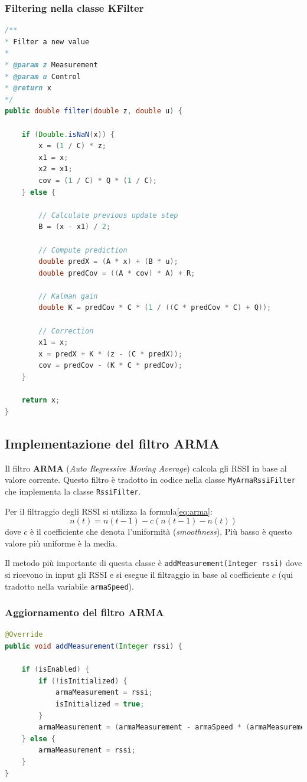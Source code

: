 \subsubsection{Filtering nella classe KFilter}
\begin{lstlisting}[language=Java]
/**
* Filter a new value
*
* @param z Measurement
* @param u Control
* @return x
*/
public double filter(double z, double u) {
   	
   	if (Double.isNaN(x)) {
   		x = (1 / C) * z;
   		x1 = x;
   		x2 = x1;
   		cov = (1 / C) * Q * (1 / C);
   	} else {
   	
    	// Calculate previous update step
    	B = (x - x1) / 2;
   	
    	// Compute prediction
    	double predX = (A * x) + (B * u);
    	double predCov = ((A * cov) * A) + R;
   	
    	// Kalman gain
    	double K = predCov * C * (1 / ((C * predCov * C) + Q));
    	
    	// Correction
    	x1 = x;
    	x = predX + K * (z - (C * predX));
    	cov = predCov - (K * C * predCov);
	}

	return x;
}
\end{lstlisting}

\subsection{Implementazione del filtro ARMA}\label{ch:filtro_arma}
Il filtro \textbf{ARMA} (\textit{Auto Regressive Moving Average}) calcola gli RSSI in base al valore corrente. Questo filtro è tradotto in codice nella classe \texttt{MyArmaRssiFilter} che implementa la classe \texttt{RssiFilter}.

Per il filtraggio degli RSSI si utilizza la formula\ref{eq:arma}:
\begin{equation}\label {eq:arma}
n(t) = n(t-1) - c (n(t-1) - n(t))
\end{equation} 
dove $ c $ è il coefficiente che denota l'uniformità (\textit{smoothness}). Più basso è questo valore più uniforme è la media.

Il metodo più importante di questa classe è \texttt{addMeasurement(Integer rssi)} dove si ricevono in input gli RSSI e si esegue il filtraggio in base al coefficiente $ c $ (qui tradotto nella variabile \texttt{armaSpeed}).

\subsubsection{Aggiornamento del filtro ARMA}
\begin{lstlisting}[language=Java]
@Override
public void addMeasurement(Integer rssi) {
    	
   	if (isEnabled) {
   		if (!isInitialized) {
   			armaMeasurement = rssi;
   			isInitialized = true;
   		}
   		armaMeasurement = (armaMeasurement - armaSpeed * (armaMeasurement - rssi));
   	} else {
    	armaMeasurement = rssi;
    }
}
\end{lstlisting}

